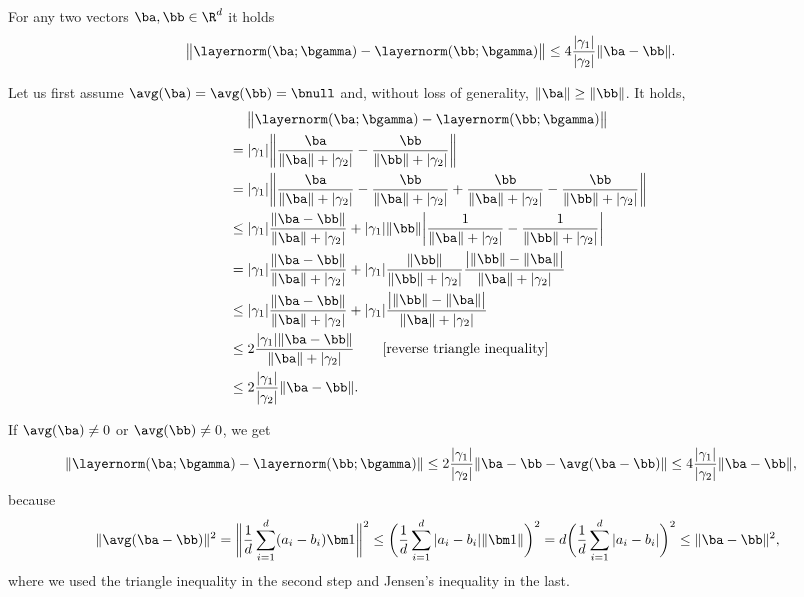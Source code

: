 \documentclass[aspectratio=169,10pt]{beamer}
\newcommand{\currentheading}{\ifx\insertsubsection\empty\insertsection\else\insertsubsection\fi}
\begin{document}
\begin{frame}{\currentheading}
\begin{lemma}[A.2]\label{lem:layernorm}
For any two vectors $\ba, \bb \in \R^d$ it holds
\begin{align*}
	\bigl\| \layernorm(\ba; \bgamma) - \layernorm(\bb; \bgamma) \bigr\| & \le 4\frac{|\gamma_1|}{|\gamma_2|}\|\ba - \bb\|.
\end{align*}
\end{lemma}
\end{frame}

\begin{frame}{\currentheading}
\small
Let us first assume $\avg(\ba) = \avg(\bb) = \bnull$ and, without loss of generality, $\|\ba\| \ge \|\bb\|$. It holds,
\begin{align*}
      & \quad \; \bigl\| \layernorm(\ba; \bgamma) - \layernorm(\bb; \bgamma) \bigr\| \\
			& = |\gamma_1| \biggl\|\frac{\ba }{\|\ba\|+|\gamma_2|} - \frac{\bb }{\|\bb\|+|\gamma_2|} \biggr\|                                                 \\
			 & =  |\gamma_1|\biggl\|\frac{\ba}{\|\ba\|+|\gamma_2|} - \frac{\bb}{\|\ba\|+|\gamma_2|} + \frac{\bb}{\|\ba\| +|\gamma_2|}  - \frac{\bb}{\|\bb\|+|\gamma_2|} \biggr\|      \\
			 & \le  |\gamma_1| \frac{\|\ba - \bb\|}{\|\ba\|+|\gamma_2|}  +  |\gamma_1|\|\bb\| \biggl|\frac{1}{\|\ba\|+|\gamma_2|}  - \frac{1}{\|\bb\|+|\gamma_2|} \biggr| \\
			 & =  |\gamma_1|\frac{\|\ba - \bb\|}{\|\ba\|+|\gamma_2|}  +  |\gamma_1| \frac{\|\bb\|}{\|\bb\| + |\gamma_2|}\frac{\bigl|\|\bb\| - \|\ba\| \bigr|}{\|\ba\|+|\gamma_2|}                   \\
			& \le  |\gamma_1|\frac{\|\ba - \bb\|}{\|\ba\|+|\gamma_2|}  +  |\gamma_1|\frac{\bigl|\|\bb\| - \|\ba\| \bigr|}{\|\ba\|+|\gamma_2|}   \\
			& \le   2\frac{|\gamma_1|\|\ba - \bb\|}{\|\ba\| +|\gamma_2|} \qquad 	[\text{reverse triangle inequality}] \\
			& \le 2\frac{|\gamma_1|}{|\gamma_2|} \|\ba - \bb\|.
\end{align*}
\end{frame}

\begin{frame}{\currentheading}
\small
If $\avg(\ba) \neq 0$ or $\avg(\bb) \neq 0$, we get
\begin{align*}
	\| \layernorm(\ba; \bgamma) - \layernorm(\bb; \bgamma) \| & \le 2\frac{|\gamma_1|}{|\gamma_2|}\|\ba - \bb - \avg(\ba - \bb)\| \le 4\frac{|\gamma_1|}{|\gamma_2|}\|\ba - \bb \|,
\end{align*}
because
\begin{align*}
	\|\avg(\ba - \bb) \|^2 = \biggl\|\frac 1 d \sum_{i = 1}^d (a_i - b_i) \bm 1 \biggr\|^2   \le \biggl(\frac 1 d \sum_{i = 1}^d |a_i - b_i| \|\bm 1 \| \biggr)^2  = d \biggl(\frac 1 d \sum_{i = 1}^d |a_i - b_i| \biggr)^2
	  \le \|\ba - \bb\|^2,
\end{align*}
where we used the triangle inequality in the second step and Jensen's inequality in the last.
\end{frame}
\end{document}
